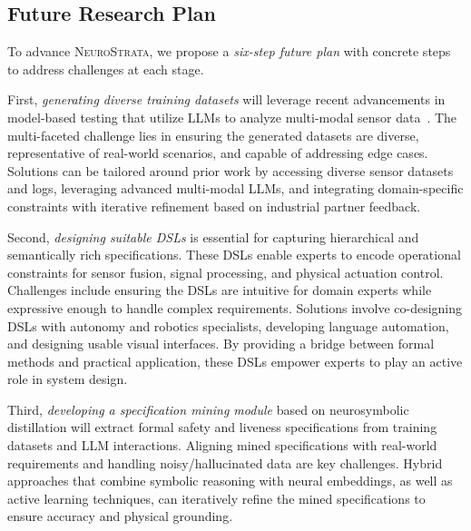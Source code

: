 \subsection{Future Research Plan}
To advance \textsc{NeuroStrata}, we propose a \textit{six-step future plan} with concrete steps to address challenges at each stage.

First, \textit{generating diverse training datasets} will leverage recent advancements in model-based testing that utilize LLMs to analyze multi-modal sensor data~\cite{zheng2024testing,deng2023target}. The multi-faceted challenge lies in ensuring the generated datasets are diverse, representative of real-world scenarios, and capable of addressing edge cases. Solutions can be tailored around prior work by accessing diverse sensor datasets and logs, leveraging advanced multi-modal LLMs, and integrating domain-specific constraints with iterative refinement based on industrial partner feedback.

Second, \textit{designing suitable DSLs} is essential for capturing hierarchical and semantically rich specifications. These DSLs enable experts to encode operational constraints for sensor fusion, signal processing, and physical actuation control. Challenges include ensuring the DSLs are intuitive for domain experts while expressive enough to handle complex requirements. Solutions involve co-designing DSLs with autonomy and robotics specialists, developing language automation, and designing usable visual interfaces. By providing a bridge between formal methods and practical application, these DSLs empower experts to play an active role in system design.

Third, \textit{developing a specification mining module} based on neurosymbolic distillation will extract formal safety and liveness specifications from training datasets and LLM interactions. Aligning mined specifications with real-world requirements and handling noisy/hallucinated data are key challenges. Hybrid approaches that combine symbolic reasoning with neural embeddings, as well as active learning techniques, can iteratively refine the mined specifications to ensure accuracy and physical grounding.



